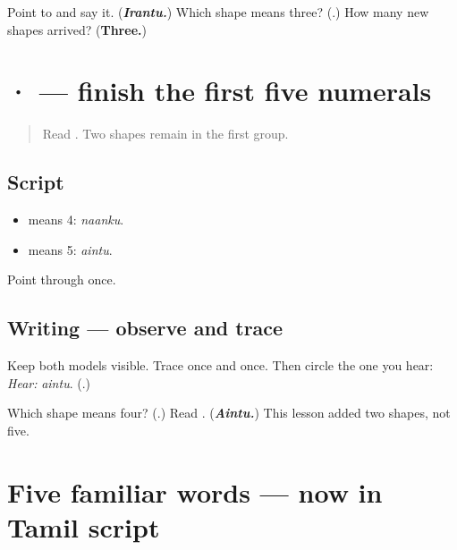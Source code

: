 \begin{tcolorbox}[breakable,colback=teal!4,colframe=teal!35!black,title={Before you move on}]
Point to \textbf{} and say it. (\emph{\textbf{Irantu.}}) Which shape means three? (\textbf{}.) How many new shapes arrived? (\textbf{Three.})
\end{tcolorbox}
\section[\texorpdfstring{\ta{௪} \ta{௫} (four, five)}{௪ ௫ (four, five)}]{ ·  — finish the first five numerals}

\label{lesson:TA-W07-digits-4-5}



\begin{quote}
Read \textbf{  }. Two shapes remain in the first group.
\end{quote}

\subsection*{Script}
\begin{itemize}
\raggedright
  \item \textbf{} means 4: \emph{naanku}.
  \item \textbf{} means 5: \emph{aintu}.
\end{itemize}

Point through \textbf{    } once.

\subsection*{Writing — observe and trace}
Keep both models visible. Trace \textbf{} once and \textbf{} once. Then circle the one you hear: \emph{Hear:} \emph{aintu}. (\textbf{}.)

\begin{tcolorbox}[breakable,colback=teal!4,colframe=teal!35!black,title={Before you move on}]
Which shape means four? (\textbf{}.) Read \textbf{}. (\emph{\textbf{Aintu.}}) This lesson added two shapes, not five.
\end{tcolorbox}
\section[\texorpdfstring{\ta{ஒன்று} \ta{இரண்டு} \ta{மூன்று} … (onru irantu …)}{ஒன்று இரண்டு மூன்று … (onru irantu …)}]{Five familiar words — now in Tamil script}


